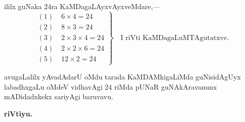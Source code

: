 ililx guNaka $24$ra KaMDagaLAyxvAyxveMdare,---
\begin{equation*}
\left.
\begin{aligned}
(1)\; & 6\times4=24\\
(2)\; & 8\times3=24\\
(3)\; & 2\times3\times4=24\\
(4)\; & 2\times2\times6=24\\
(5)\; & 12\times2=24
\end{aligned}
\right\}
\quad\text{I riVti KaMDagaLuMTAgutatxve.}
\end{equation*}

avugaLalilx yAvadAdarU oMdu tarada KaMDAMkigaLiMda guNisidAgUyx labadhxgaLu oMdeV vidhavAgi $24$ riMda pUNaR guNAkAravanunx mADidadxkekx sariyAgi baruvavu.

\eject

\begin{center}
{\large\bf riVtiyu.}
\end{center}

